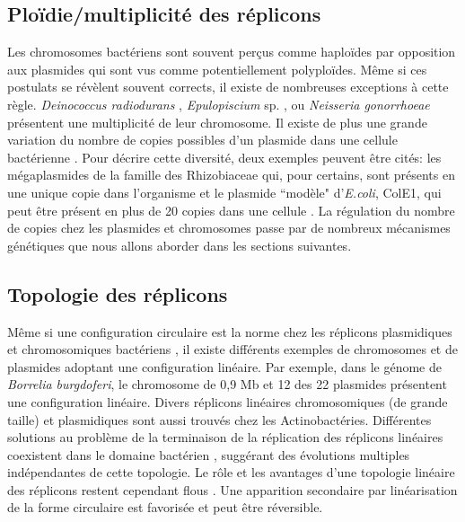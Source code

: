 \subsection{Ploïdie/multiplicité des réplicons}
 Les chromosomes bactériens sont souvent perçus comme haploïdes \citep{casjens1998diverse} par opposition aux plasmides qui sont vus comme potentiellement polyploïdes. Même si ces postulats se révèlent souvent corrects, il existe de nombreuses exceptions à cette règle. \textit{Deinococcus radiodurans} \citep{White1999}, \textit{Epulopiscium} sp. \citep{mendell2008extreme}, ou \textit{Neisseria gonorrhoeae} \citep{tobiason2006obligate} présentent une multiplicité de leur chromosome. Il existe de plus une grande variation du nombre de copies possibles d'un plasmide dans une cellule bactérienne \citep{helinski2004introduction}. Pour décrire cette diversité, deux exemples peuvent être cités: les mégaplasmides de la famille des Rhizobiaceae qui, pour certains, sont présents en une unique copie dans l'organisme \citep{Pinto2012} et le plasmide ``modèle" d'\textit{E.coli}, ColE1, qui peut être présent en plus de 20 copies dans une cellule \citep{summers1984multimerization}.
 La régulation du nombre de copies chez les plasmides et chromosomes passe par de nombreux mécanismes génétiques que nous allons aborder dans les sections suivantes.


 \subsection{Topologie des réplicons}
	Même si une configuration circulaire est la norme chez les réplicons plasmidiques et chromosomiques bactériens \citep{casjens1998diverse}, il existe différents exemples de chromosomes \citep{chaconas2005replication} et de plasmides \citep{stewart2004linear} adoptant une configuration linéaire. Par exemple, dans le génome de \textit{Borrelia burgdoferi}, le chromosome de 0,9 Mb et 12 des 22 plasmides présentent une configuration linéaire. Divers réplicons linéaires chromosomiques (de grande taille) et plasmidiques sont aussi trouvés chez les Actinobactéries. Différentes solutions au problème de la terminaison de la réplication des réplicons linéaires coexistent dans le domaine bactérien \citep{hinnebusch1993linear}, suggérant des évolutions multiples indépendantes de cette topologie. Le rôle et les avantages d'une topologie linéaire des réplicons restent cependant flous \citep{casjens1998diverse,chaconas2005linear}. Une apparition secondaire par linéarisation de la forme circulaire est favorisée \citep{volff2000new} et peut être réversible.
 

